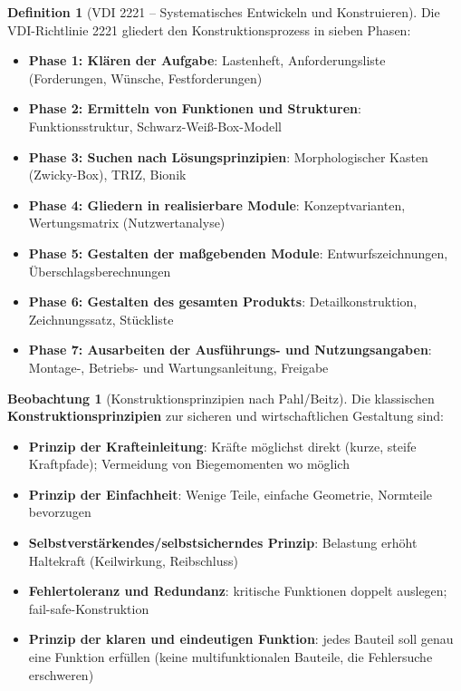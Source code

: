 ﻿\documentclass[a4paper,12pt]{report}
\theoremstyle{definition}
\newtheorem{definition}{Definition}
\newtheorem{beobachtung}{Beobachtung}
\begin{document}
\begin{definition}[VDI 2221 -- Systematisches Entwickeln und Konstruieren]
Die VDI-Richtlinie 2221 gliedert den Konstruktionsprozess in sieben Phasen:
\begin{itemize}
    \item[-] \textbf{Phase 1: Klären der Aufgabe}: Lastenheft, Anforderungsliste
          (Forderungen, Wünsche, Festforderungen)
    \item[-] \textbf{Phase 2: Ermitteln von Funktionen und Strukturen}:
          Funktionsstruktur, Schwarz-Weiß-Box-Modell
    \item[-] \textbf{Phase 3: Suchen nach Lösungsprinzipien}:
          Morphologischer Kasten (Zwicky-Box), TRIZ, Bionik
    \item[-] \textbf{Phase 4: Gliedern in realisierbare Module}:
          Konzeptvarianten, Wertungsmatrix (Nutzwertanalyse)
    \item[-] \textbf{Phase 5: Gestalten der maßgebenden Module}:
          Entwurfszeichnungen, Überschlagsberechnungen
    \item[-] \textbf{Phase 6: Gestalten des gesamten Produkts}:
          Detailkonstruktion, Zeichnungssatz, Stückliste
    \item[-] \textbf{Phase 7: Ausarbeiten der Ausführungs- und Nutzungsangaben}:
          Montage-, Betriebs- und Wartungsanleitung, Freigabe
\end{itemize}
\end{definition}

\begin{beobachtung}[Konstruktionsprinzipien nach Pahl/Beitz]
Die klassischen \textbf{Konstruktionsprinzipien} zur sicheren und
wirtschaftlichen Gestaltung sind:
\begin{itemize}
    \item[-] \textbf{Prinzip der Krafteinleitung}: Kräfte möglichst direkt
          (kurze, steife Kraftpfade); Vermeidung von Biegemomenten wo möglich
    \item[-] \textbf{Prinzip der Einfachheit}: Wenige Teile, einfache Geometrie,
          Normteile bevorzugen
    \item[-] \textbf{Selbstverstärkendes/selbstsicherndes Prinzip}:
          Belastung erhöht Haltekraft (Keilwirkung, Reibschluss)
    \item[-] \textbf{Fehlertoleranz und Redundanz}: kritische Funktionen
          doppelt auslegen; fail-safe-Konstruktion
    \item[-] \textbf{Prinzip der klaren und eindeutigen Funktion}:
          jedes Bauteil soll genau eine Funktion erfüllen
          (keine multifunktionalen Bauteile, die Fehlersuche erschweren)
\end{itemize}
\end{beobachtung}
\end{document}
